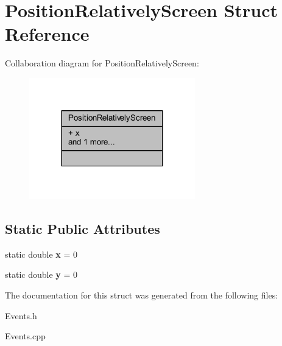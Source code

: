 \hypertarget{struct_position_relatively_screen}{}\section{Position\+Relatively\+Screen Struct Reference}
\label{struct_position_relatively_screen}


Collaboration diagram for Position\+Relatively\+Screen\+:\nopagebreak
\begin{figure}[H]
\begin{center}
\leavevmode
\includegraphics[width=204pt]{struct_position_relatively_screen__coll__graph}
\end{center}
\end{figure}
\subsection*{Static Public Attributes}
\begin{DoxyCompactItemize}
\item 
\mbox{\label{struct_position_relatively_screen_ac1e997b81f9705f4a76f1bf9df9f9fd9}} 
static double {\bfseries x} = 0
\item 
\mbox{\label{struct_position_relatively_screen_a1b0b578732e926941d2b5533bcc16c62}} 
static double {\bfseries y} = 0
\end{DoxyCompactItemize}


The documentation for this struct was generated from the following files\+:\begin{DoxyCompactItemize}
\item 
Events.\+h\item 
Events.\+cpp\end{DoxyCompactItemize}
